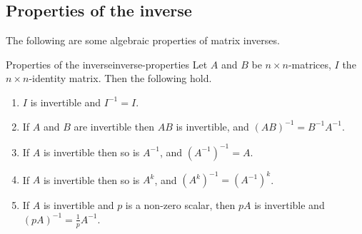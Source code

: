 \subsection{Properties of the inverse}

The following are some algebraic properties of matrix inverses.

\begin{theorem}{Properties of the inverse}{inverse-properties}
  Let $A$ and $B$ be $n \times n$-matrices, $I$ the $n\times
  n$-identity matrix. Then the following hold.
  \begin{enumerate}
  \item $I$ is invertible and $I^{-1} = I$.
  \item If $A$ and $B$ are invertible then $AB$ is invertible, and
    $(AB)^{-1} = B^{-1}A^{-1}$.
  \item If $A$ is invertible then so is $A^{-1}$, and
    $(A^{-1})^{-1} = A$.
  \item If $A$ is invertible then so is $A^k$, and
    $(A^k)^{-1} = (A^{-1})^k$.
  \item If $A$ is invertible and $p$ is a non-zero scalar, then $pA$
    is invertible and $(pA)^{-1} = \frac{1}{p}A^{-1}$.
  \end{enumerate}
\end{theorem}

